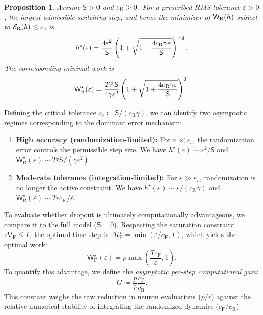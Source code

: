 \documentclass[twoside,11pt]{article}
\theoremstyle{plain}
\newtheorem{proposition}[theorem]{Proposition}
\begin{document}
\begin{proposition}\label{prop:fixed_epsilon}
Assume $\mathsf S>0$ and $c_{\rm R}>0$. For a prescribed RMS tolerance $\varepsilon>0$, the largest admissible switching step, and hence the minimizer of $\mathsf W_{\rm R}(h)$ subject to $\mathcal E_{\rm R}(h)\le\varepsilon$, is
\begin{equation}\label{eq:optimal_h_rbm}
h^\star(\varepsilon)
=
\frac{4\varepsilon^2}{\mathsf S}
\left(
1+\sqrt{1+\frac{4c_{\rm R}\gamma\varepsilon}{\mathsf S}}
\right)^{-2}.
\end{equation}
The corresponding minimal work is
\begin{equation}\label{eq:optimal_cost_rbm}
\mathsf W_{\rm R}^\star(\varepsilon)
=
\frac{T\bar r\,\mathsf S}{4\gamma\varepsilon^2}
\left(
1+\sqrt{1+\frac{4c_{\rm R}\gamma\varepsilon}{\mathsf S}}
\right)^2.
\end{equation}
\end{proposition}

Defining the critical tolerance $\varepsilon_c \coloneqq \mathsf{S}/(c_{\mathrm{R}}\gamma)$, we can identify two asymptotic regimes corresponding to the dominant error mechanism:
\begin{enumerate}
\item \textbf{High accuracy (randomization-limited):} For $\varepsilon \ll \varepsilon_c$, the randomization error controls the permissible step size. We have $h^\star(\varepsilon) \sim \varepsilon^2/\mathsf{S}$ and $\mathsf W_{\mathrm{R}}^\star(\varepsilon) \sim T\bar r\mathsf{S}/(\gamma\varepsilon^2)$.
\item \textbf{Moderate tolerance (integration-limited):} For $\varepsilon \gg \varepsilon_c$, randomization is no longer the active constraint. We have $h^\star(\varepsilon) \sim \varepsilon/(c_{\mathrm{R}}\gamma)$ and $\mathsf W_{\mathrm{R}}^\star(\varepsilon) \sim T\bar r c_{\mathrm{R}}/\varepsilon$.
\end{enumerate}

To evaluate whether dropout is ultimately computationally advantageous, we compare it to the full model ($\mathsf{S}=0$). Respecting the saturation constraint $\Delta t_{\mathrm{F}} \le T$, the optimal time step is $\Delta t_{\mathrm{F}}^\star = \min(\varepsilon/c_{\mathrm{F}}, T)$, which yields the optimal work:
\begin{equation}\label{eq:optimal_cost_fm}
\mathsf W_{\mathrm{F}}^\star(\varepsilon) = p\max\left(\frac{T c_{\mathrm{F}}}{\varepsilon}, 1\right).
\end{equation}
To quantify this advantage, we define the \emph{asymptotic per-step computational gain}:
\begin{equation}\label{eq:definition_G}
G \coloneqq \frac{p}{\bar r} \frac{c_{\mathrm{F}}}{c_{\mathrm{R}}}.
\end{equation}
This constant weighs the raw reduction in neuron evaluations ($p/\bar r$) against the relative numerical stability of integrating the randomized dynamics ($c_{\mathrm{F}}/c_{\mathrm{R}}$).
\end{document}
